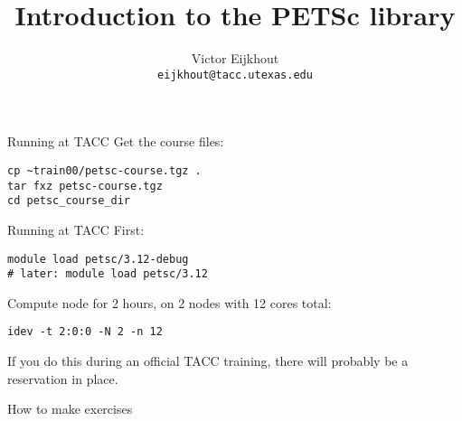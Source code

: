 \documentclass[11pt]{beamer}
\def\n{\bgroup\catcode`\_=12 \catcode`\&=12 \catcode`\$=12 
    \catcode`\<=12 \catcode`\>=12 \catcode`\~=12
    \tt \let\next=}
\begin{document}
\title{Introduction to the PETSc library}
\author{Victor Eijkhout\\
\tt\normalsize eijkhout@tacc.utexas.edu}
\date{}
\frame{\titlepage}


\begin{xsede}
  
\end{xsede}





\begin{frame}[containsverbatim]{Running at TACC}
  Get the course files:
\begin{verbatim}
cp ~train00/petsc-course.tgz .
tar fxz petsc-course.tgz
cd petsc_course_dir
\end{verbatim}
\end{frame}

\begin{frame}[containsverbatim]{Running at TACC}
  First:
\begin{verbatim}
module load petsc/3.12-debug
# later: module load petsc/3.12
\end{verbatim}
  Compute node for 2 hours, on 2 nodes with 12 cores total:
\begin{verbatim}
idev -t 2:0:0 -N 2 -n 12
\end{verbatim}
If you do this during an official TACC training,
there will probably be a reservation in place.
\end{frame}

\begin{frame}[containsverbatim]{How to make exercises}
\end{frame}


%






\begin{longversion}
  
  
\end{longversion}


\end{document}
